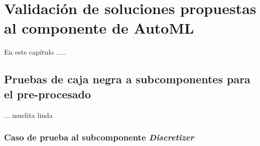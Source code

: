 \chapter{Validación de soluciones propuestas al componente de AutoML}\label{chap:3}
En este capítulo .....


\section{Pruebas de caja negra a subcomponentes para el pre-procesado}

... muelita linda

\subsection{Caso de prueba al subcomponente \textit{Discretizer}}

